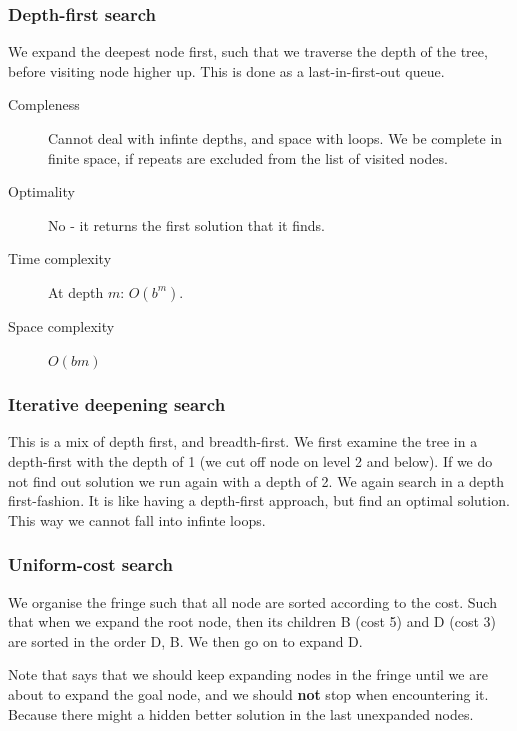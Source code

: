 \documentclass{article}
\begin{document}
\subsubsection{Depth-first search}%
\label{par:depth_first_search}
We expand the deepest node first, such that we traverse the depth of the tree,
before visiting node higher up. This is done as a last-in-first-out queue.

\begin{description}
  \item[Compleness] Cannot deal with infinte depths, and space with loops. We be
    complete in finite space, if repeats are excluded from the list of visited
    nodes.
  \item[Optimality] No - it returns the first solution that it finds.
  \item[Time complexity] At depth $m$: $O(b^m)$.
  \item[Space complexity] $O(bm)$
\end{description}

\subsubsection{Iterative deepening search}%
\label{par:iterative_deepening_search}
This is a mix of depth first, and breadth-first. We first examine the tree in a
depth-first with the depth of 1 (we cut off node on level 2 and below). If we do
not find out solution we run again with a depth of 2. We again search in a depth
first-fashion. It is like having a depth-first approach, but find an optimal
solution. This way we cannot fall into infinte loops.


\subsubsection{Uniform-cost search}%
\label{par:uniform_cost_search}
We organise the fringe such that all node are sorted according to the cost. Such
that when we expand the root node, then its children B (cost 5) and D (cost 3)
are sorted in the order D, B. We then go on to expand D.

Note that \cite[p. 33]{presentation:solving_problems_by_searching} says that we
should keep expanding nodes in the fringe until we are about to expand the goal
node, and we should \textbf{not} stop when encountering it. Because there might
a hidden better solution in the last unexpanded nodes.



\newpage
\end{document}

